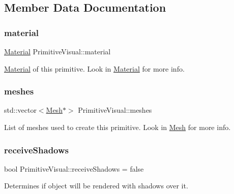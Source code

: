 \subsection{Member Data Documentation}
\mbox{\label{class_primitive_visual_a775945d5dc204a98315eda90d6482278}} 
\subsubsection{\texorpdfstring{material}{material}}
{\footnotesize\ttfamily \mbox{\hyperlink{struct_material}{Material}} Primitive\+Visual\+::material}



\mbox{\hyperlink{struct_material}{Material}} of this primitive. Look in \mbox{\hyperlink{struct_material}{Material}} for more info. 

\mbox{\label{class_primitive_visual_a12252f7d680eb47471a13d121c0898d5}} 
\subsubsection{\texorpdfstring{meshes}{meshes}}
{\footnotesize\ttfamily std\+::vector$<$\mbox{\hyperlink{class_mesh}{Mesh}}$\ast$$>$ Primitive\+Visual\+::meshes}



List of meshes used to create this primitive. Look in \mbox{\hyperlink{class_mesh}{Mesh}} for more info. 

\mbox{\label{class_primitive_visual_ab3f6291a1a2914f0403ae118f8d9d8e5}} 
\subsubsection{\texorpdfstring{receiveShadows}{receiveShadows}}
{\footnotesize\ttfamily bool Primitive\+Visual\+::receive\+Shadows = false}



Determines if object will be rendered with shadows over it. 

